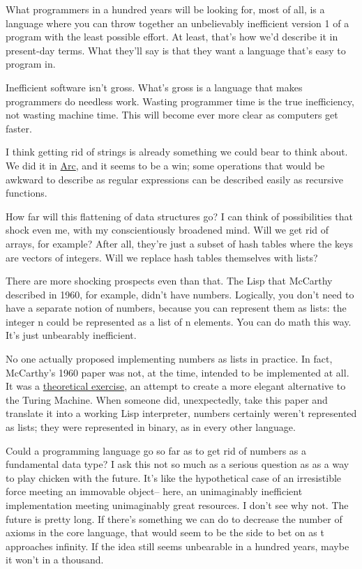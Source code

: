 What programmers in a hundred years will be looking for, most of all, is
a language where you can throw together an unbelievably inefficient
version 1 of a program with the least possible effort. At least, that's
how we'd describe it in present-day terms. What they'll say is that they
want a language that's easy to program in.

Inefficient software isn't gross. What's gross is a language that makes
programmers do needless work. Wasting programmer time is the true
inefficiency, not wasting machine time. This will become ever more clear
as computers get faster.

I think getting rid of strings is already something we could bear to
think about. We did it in \href{arc.html}{Arc}, and it seems to be a
win; some operations that would be awkward to describe as regular
expressions can be described easily as recursive functions.

How far will this flattening of data structures go? I can think of
possibilities that shock even me, with my conscientiously broadened
mind. Will we get rid of arrays, for example? After all, they're just a
subset of hash tables where the keys are vectors of integers. Will we
replace hash tables themselves with lists?

There are more shocking prospects even than that. The Lisp that McCarthy
described in 1960, for example, didn't have numbers. Logically, you
don't need to have a separate notion of numbers, because you can
represent them as lists: the integer n could be represented as a list of
n elements. You can do math this way. It's just unbearably inefficient.

No one actually proposed implementing numbers as lists in practice. In
fact, McCarthy's 1960 paper was not, at the time, intended to be
implemented at all. It was a \href{rootsoflisp.html}{theoretical
exercise}, an attempt to create a more elegant alternative to the Turing
Machine. When someone did, unexpectedly, take this paper and translate
it into a working Lisp interpreter, numbers certainly weren't
represented as lists; they were represented in binary, as in every other
language.

Could a programming language go so far as to get rid of numbers as a
fundamental data type? I ask this not so much as a serious question as
as a way to play chicken with the future. It's like the hypothetical
case of an irresistible force meeting an immovable object-- here, an
unimaginably inefficient implementation meeting unimaginably great
resources. I don't see why not. The future is pretty long. If there's
something we can do to decrease the number of axioms in the core
language, that would seem to be the side to bet on as t approaches
infinity. If the idea still seems unbearable in a hundred years, maybe
it won't in a thousand.

